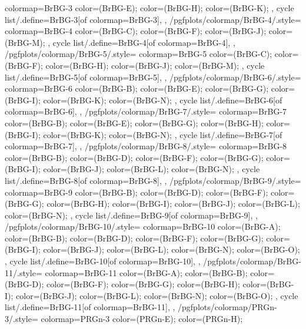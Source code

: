 {{    colormap={BrBG-3}{
      color=(BrBG-E);
      color=(BrBG-H);
      color=(BrBG-K);
    },
    cycle list/.define={BrBG-3}{[of colormap=BrBG-3]},
  },
  /pgfplots/colormap/BrBG-4/.style={
    colormap={BrBG-4}{
      color=(BrBG-C);
      color=(BrBG-F);
      color=(BrBG-J);
      color=(BrBG-M);
    },
    cycle list/.define={BrBG-4}{[of colormap=BrBG-4]},
  },
  /pgfplots/colormap/BrBG-5/.style={
    colormap={BrBG-5}{
      color=(BrBG-C);
      color=(BrBG-F);
      color=(BrBG-H);
      color=(BrBG-J);
      color=(BrBG-M);
    },
    cycle list/.define={BrBG-5}{[of colormap=BrBG-5]},
  },
  /pgfplots/colormap/BrBG-6/.style={
    colormap={BrBG-6}{
      color=(BrBG-B);
      color=(BrBG-E);
      color=(BrBG-G);
      color=(BrBG-I);
      color=(BrBG-K);
      color=(BrBG-N);
    },
    cycle list/.define={BrBG-6}{[of colormap=BrBG-6]},
  },
  /pgfplots/colormap/BrBG-7/.style={
    colormap={BrBG-7}{
      color=(BrBG-B);
      color=(BrBG-E);
      color=(BrBG-G);
      color=(BrBG-H);
      color=(BrBG-I);
      color=(BrBG-K);
      color=(BrBG-N);
    },
    cycle list/.define={BrBG-7}{[of colormap=BrBG-7]},
  },
  /pgfplots/colormap/BrBG-8/.style={
    colormap={BrBG-8}{
      color=(BrBG-B);
      color=(BrBG-D);
      color=(BrBG-F);
      color=(BrBG-G);
      color=(BrBG-I);
      color=(BrBG-J);
      color=(BrBG-L);
      color=(BrBG-N);
    },
    cycle list/.define={BrBG-8}{[of colormap=BrBG-8]},
  },
  /pgfplots/colormap/BrBG-9/.style={
    colormap={BrBG-9}{
      color=(BrBG-B);
      color=(BrBG-D);
      color=(BrBG-F);
      color=(BrBG-G);
      color=(BrBG-H);
      color=(BrBG-I);
      color=(BrBG-J);
      color=(BrBG-L);
      color=(BrBG-N);
    },
    cycle list/.define={BrBG-9}{[of colormap=BrBG-9]},
  },
  /pgfplots/colormap/BrBG-10/.style={
    colormap={BrBG-10}{
      color=(BrBG-A);
      color=(BrBG-B);
      color=(BrBG-D);
      color=(BrBG-F);
      color=(BrBG-G);
      color=(BrBG-I);
      color=(BrBG-J);
      color=(BrBG-L);
      color=(BrBG-N);
      color=(BrBG-O);
    },
    cycle list/.define={BrBG-10}{[of colormap=BrBG-10]},
  },
  /pgfplots/colormap/BrBG-11/.style={
    colormap={BrBG-11}{
      color=(BrBG-A);
      color=(BrBG-B);
      color=(BrBG-D);
      color=(BrBG-F);
      color=(BrBG-G);
      color=(BrBG-H);
      color=(BrBG-I);
      color=(BrBG-J);
      color=(BrBG-L);
      color=(BrBG-N);
      color=(BrBG-O);
    },
    cycle list/.define={BrBG-11}{[of colormap=BrBG-11]},
  },
  /pgfplots/colormap/PRGn-3/.style={
    colormap={PRGn-3}{
      color=(PRGn-E);
      color=(PRGn-H);
}}}
